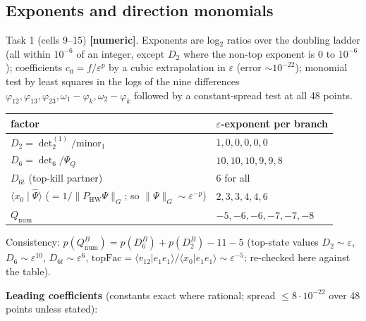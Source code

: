 \documentclass[10pt]{article}
\begin{document}
\subsection{Exponents and direction monomials}\label{sec:detsexp}

Task 1 (cells 9--15) \textbf{[numeric]}. Exponents are log$_2$ ratios over the doubling ladder (all within $10^{-6}$ of an integer, except $D_2$ where the non-top exponent is 0 to $10^{-6}$); coefficients $c_0=f/\varepsilon^p$ by a cubic extrapolation in $\varepsilon$ (error $\sim10^{-22}$); monomial test by least squares in the logs of the nine differences $\varphi_{12},\varphi_{13},\varphi_{23},\omega_1-\varphi_k,\omega_2-\varphi_k$ followed by a constant-spread test at all 48 points.

\begin{center}\small\setlength{\tabcolsep}{3pt}\begin{longtable}{@{}p{8.5cm}p{6.0cm}@{}}\toprule
\textbf{factor} & \textbf{$\varepsilon$-exponent per branch} \\\midrule\endhead
$D_2=\det_2^{(1)}/\mathrm{minor}_1$ & $1,0,0,0,0,0$ \\
$D_6=\det_6/\Psi_Q$ & $10,10,10,9,9,8$ \\
$D_{6t}$ (top-kill partner) & $6$ for all \\
$\langle x_0\mid\hat\Psi\rangle$ ($=1/\lVert P_{\mathrm{HW}}\Psi\rVert_G$; so $\lVert\Psi\rVert_G\sim\varepsilon^{-p}$) & $2,3,3,4,4,6$ \\
$Q_{\mathrm{num}}$ & $-5,-6,-6,-7,-7,-8$ \\
\bottomrule\end{longtable}\end{center}

Consistency: $p(Q_{\mathrm{num}}^B)=p(D_6^B)+p(D_2^B)-11-5$ (top-state values $D_2\sim\varepsilon$, $D_6\sim\varepsilon^{10}$, $D_{6t}\sim\varepsilon^6$, $\mathrm{topFac}=\langle v_{12}|e_1e_1\rangle/\langle x_0|e_1e_1\rangle\sim\varepsilon^{-5}$; re-checked here against the table).

\textbf{Leading coefficients} (constants exact where rational; spread $\le8\cdot10^{-22}$ over 48 points unless stated):
\end{document}
